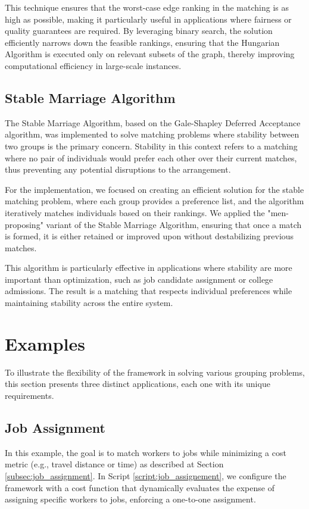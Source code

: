         This technique ensures that the worst-case edge ranking in the matching is as high as possible, making it particularly useful in applications where fairness or quality guarantees are required. By leveraging binary search, the solution efficiently narrows down the feasible rankings, ensuring that the Hungarian Algorithm is executed only on relevant subsets of the graph, thereby improving computational efficiency in large-scale instances.
        
    
    \subsection{Stable Marriage Algorithm}
    The Stable Marriage Algorithm, based on the Gale-Shapley Deferred Acceptance algorithm, was implemented to solve matching problems where stability between two groups is the primary concern. Stability in this context refers to a matching where no pair of individuals would prefer each other over their current matches, thus preventing any potential disruptions to the arrangement.
    
    For the implementation, we focused on creating an efficient solution for the stable matching problem, where each group provides a preference list, and the algorithm iteratively matches individuals based on their rankings. We applied the "men-proposing" variant of the Stable Marriage Algorithm, ensuring that once a match is formed, it is either retained or improved upon without destabilizing previous matches.
    
    This algorithm is particularly effective in applications where stability are more important than optimization, such as job candidate assignment or college admissions. The result is a matching that respects individual preferences while maintaining stability across the entire system.

    \section{Examples} \label{sec:examples}
To illustrate the flexibility of the framework in solving various grouping problems, this section presents three distinct applications, each one with its unique requirements.

\subsection{Job Assignment}
In this example, the goal is to match workers to jobs while minimizing a cost metric (e.g., travel distance or time) as described at Section \ref{subsec:job_assignment}. In Script \ref{script:job_assignement}, we configure the framework with a cost function that dynamically evaluates the expense of assigning specific workers to jobs, enforcing a one-to-one assignment.

